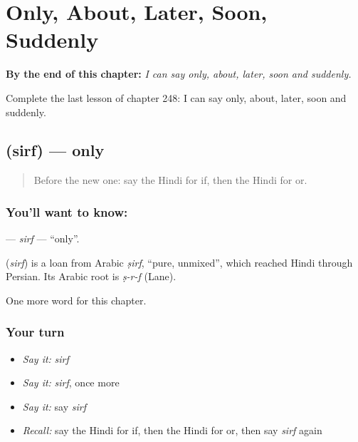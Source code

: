 
\chapter{Only, About, Later, Soon, Suddenly}
\label{ch:hi-only-about-later-soon-suddenly}

\begin{chapteropening}
\textbf{By the end of this chapter:} \emph{I can say only, about, later, soon and suddenly.}

Complete the last lesson of chapter 248: I can say only, about, later, soon and suddenly.
\end{chapteropening}

\section[\texorpdfstring{\hi{सिर्फ़} (sirf)}{सिर्फ़ (sirf)}]{ (sirf) — only}

\label{lesson:HI-C248-sirf}



\begin{quote}
Before the new one: say the Hindi for if, then the Hindi for or.
\end{quote}

\subsection*{You'll want to know: }
\textbf{} — \emph{sirf} — \textquotedblleft{}only\textquotedblright{}.

\begin{cousinweb}
\textbf{} (\emph{sirf}) is a loan from Arabic \emph{ṣirf}, \textquotedblleft{}pure, unmixed\textquotedblright{}, which reached Hindi through Persian. Its Arabic root is \emph{ṣ-r-f} (Lane).
\end{cousinweb}

\begin{grammarlens}[title={What you've built}]
One more word for this chapter.
\end{grammarlens}

\subsection*{Your turn}
\begin{itemize}
\raggedright
  \item \emph{Say it:} \emph{sirf}
  \item \emph{Say it:} \emph{sirf}, once more
  \item \emph{Say it:} say \emph{sirf}
  \item \emph{Recall:} say the Hindi for if, then the Hindi for or, then say \emph{sirf} again
\end{itemize}

